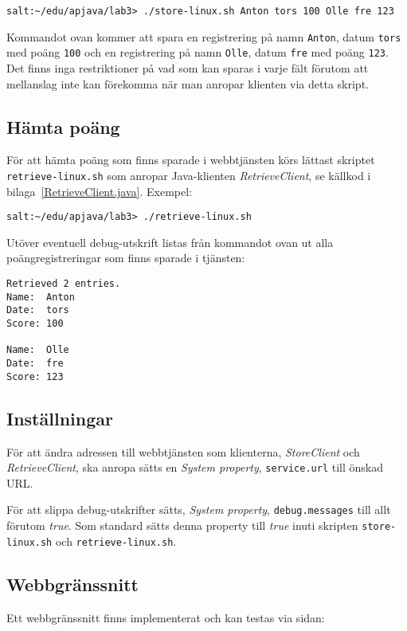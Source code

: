 \documentclass[a4paper, 12pt]{article}
\begin{document}
\begin{footnotesize}
\verb!salt:~/edu/apjava/lab3> ./store-linux.sh Anton tors 100 Olle fre 123!
\end{footnotesize}

Kommandot ovan kommer att spara en registrering på namn \verb!Anton!,
datum \verb!tors! med poäng \verb!100! och en registrering på namn
\verb!Olle!, datum \verb!fre! med poäng \verb!123!. Det finns inga
restriktioner på vad som kan sparas i varje fält förutom att
mellanslag inte kan förekomma när man anropar klienten via detta
skript.

\subsection{Hämta poäng}

För att hämta poäng som finns sparade i webbtjänsten körs lättast
skriptet \texttt{retrieve-linux.sh} som anropar Java-klienten
\textit{RetrieveClient}, se källkod i
bilaga~\ref{RetrieveClient.java}. Exempel:

\begin{footnotesize}
\verb!salt:~/edu/apjava/lab3> ./retrieve-linux.sh !
\end{footnotesize}

Utöver eventuell debug-utskrift listas från kommandot ovan ut alla
poäng\-registreringar som finns sparade i tjänsten:

\begin{footnotesize}
\begin{verbatim}
Retrieved 2 entries.
Name:  Anton
Date:  tors
Score: 100

Name:  Olle
Date:  fre
Score: 123
\end{verbatim}
\end{footnotesize}

\subsection{Inställningar}
För att ändra adressen till webbtjänsten som klienterna,
\textit{StoreClient} och \textit{RetrieveClient}, ska anropa sätts en
\textit{System property}, \verb!service.url! till önskad URL.

För att slippa debug-utskrifter sätts, \textit{System property}, 
\verb!debug.messages! till allt förutom \textit{true}. Som standard
sätts denna property till \textit{true} inuti skripten
\verb!store-linux.sh! och \verb!retrieve-linux.sh!.

\subsection{Webbgränssnitt}
Ett webbgränssnitt finns implementerat och kan testas via sidan:
\end{document}
